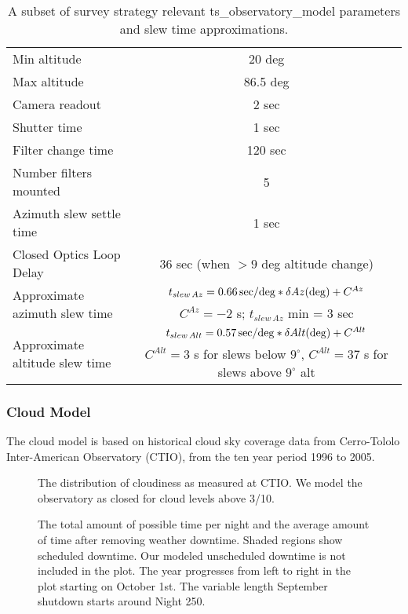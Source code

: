\begin{table}[b]
\begin{centering}
\begin{tabular}{lc}
\toprule
Min altitude  & 20 deg \\
Max altitude & 86.5 deg \\
Camera readout & 2 sec\\
Shutter time & 1 sec \\
Filter change time & 120 sec \\
Number filters mounted & 5 \\
Azimuth slew settle time & 1 sec \\
Closed Optics Loop Delay & 36 sec (when $>9$ deg altitude change) \\
\multirow{2}{*}{Approximate azimuth slew time} &   $ t_{slew \, Az} = 0.66 \, {\rm sec/deg} * \delta Az ({\rm deg}) + C^{Az} $  \\
   &   $C^{Az} = -2$ s;   $t_{slew \, Az}$  min = 3 sec \\
\multirow{2}{*}{Approximate altitude slew time}  &  $  t_{slew \, Alt} = 0.57 \, {\rm sec/deg} * \delta Alt ({\rm deg}) + C^{Alt} $ \\
   & $C^{Alt} = 3$ s for slews below $9^\circ$, $C^{Alt} = 37$ s for slews above $9^\circ$ alt \\
\hline
\end{tabular}
\caption{A subset of survey strategy relevant ts\_observatory\_model parameters and slew time approximations.}
\label{tab:tsModel}
\end{centering}
\end{table}

\subsubsection{Cloud Model}

The cloud model is based on historical cloud sky coverage data from Cerro-Tololo Inter-American Observatory (CTIO), from the ten year period 1996 to 2005. 

\begin{figure}
\caption{The distribution of cloudiness as measured at CTIO. We model the observatory as closed for cloud levels above 3/10.}
\end{figure}

\begin{figure}
\caption{The total amount of possible time per night and the average amount of time after removing weather downtime. Shaded regions show scheduled downtime. Our modeled unscheduled downtime is not included in the plot. The year progresses from left to right in the plot starting on October 1st. The variable length September shutdown starts around Night 250.}
\end{figure}

